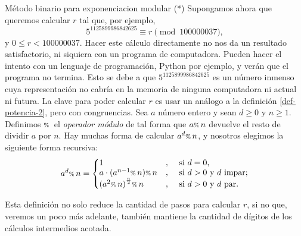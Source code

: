 \begin{section}{Método binario para exponenciacion modular (*)}
    Supongamos ahora que queremos calcular $r$ tal que, por ejemplo,  
$$
    5^{1125899986842625} \equiv r \pmod{100000037},
$$
 y $0 \le r < 100000037$. Hacer este cálculo  directamente no nos da un resultado satisfactorio, ni siquiera con un programa de computadora. Pueden hacer el intento con un lenguaje de programación, Python por ejemplo, y verán que el programa no termina. Esto se debe a que $5^{1125899986842625}$  es un número inmenso  cuya representación no cabría en la memoria de ninguna computadora ni actual ni futura. La clave  para poder calcular $r$ es usar un análogo a la definición \eqref{def-potencia-2}, pero con congruencias. Sea $a$ número entero y sean $d \ge 0$ y $n \ge 1$. Definimos ${\scriptstyle \%}\,$ el \textit{operador módulo} de tal forma que $a {\scriptstyle \%}\, n$ devuelve el resto de dividir $a$ por $n$. Hay muchas forma de calcular $a^d {\scriptstyle \%}\, n$, y nosotros elegimos  la siguiente forma recursiva:
 \begin{equation}\label{def-potencia-mod-1}
    a^d \modulo n = \left\{
    \begin{matrix*}[l]
        1&,&\text{ si $d = 0$,} \\
        a \cdot (a^{n-1} \modulo n) \modulo n &,&\text{  si $d > 0$ y  $d$ impar;} \\
        {(a^2 \modulo n)}^{\frac{n}{2}}\modulo n&,&\text{  si $d > 0$ y  $d$ par.}
    \end{matrix*}\right.   
\end{equation}

  Esta definición no solo reduce la cantidad de pasos para calcular $r$, si no que, veremos un poco más adelante, también mantiene la cantidad de dígitos de los cálculos intermedios acotada.


\end{section}
